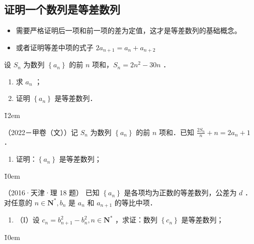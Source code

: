 \vspace{6em}

\subsection{证明一个数列是等差数列}

\begin{theorem}
    \begin{itemize}
        \item 需要严格证明后一项和前一项的差为定值，这才是等差数列的基础概念。
        \item 或者证明等差中项的式子 $2 a_{n+1} = a_{n} + a_{n+2}$
    \end{itemize}
\end{theorem}

\begin{example}
    设 $S_n$ 为数列 $\left\{a_n\right\}$ 的前 $n$ 项和，$S_n=2 n^2-30 n$ ．
    \begin{enumerate}
        \item 求 $a_n$ ；

        \item 证明 $\left\{a_n\right\}$ 是等差数列．
    \end{enumerate}
\end{example}

\v{12em}

\begin{example}
    （2022－甲卷（文））记 $S_n$ 为数列 $\left\{a_n\right\}$ 的前 $n$ 项和．已知 $\frac{2 S_n}{n}+n=2 a_n+1$ ．
    \begin{enumerate}
        \item 证明：$\left\{a_n\right\}$ 是等差数列；
    \end{enumerate}
\end{example}

\v{10em}

\begin{example}（2016·天津·理 18 题）
    已知 $\left\{a_n\right\}$ 是各项均为正数的等差数列，公差为 $d$ ．对任意的 $n \in \mathbf{N}^*, b_n$ 是 $a_n$ 和 $a_{n+1}$ 的等比中项．
    \begin{enumerate}
        \item （I）设 $c_n=b_{n+1}^2-b_n^2, n \in \mathbf{N}^*$ ，求证：数列 $\left\{c_n\right\}$ 是等差数列；
    \end{enumerate}
\end{example}

\v{10em}



